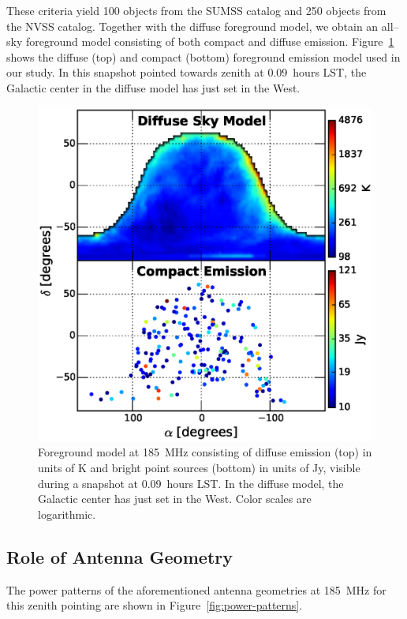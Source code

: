 \documentclass[preprint2,iop,numberedappendix,twocolappendix,appendixfloats]{emulateapj}
\begin{document}
These criteria yield 100 objects from the SUMSS catalog and 250 objects from the NVSS catalog. Together with the diffuse foreground model, we obtain an all--sky foreground model consisting of both compact and diffuse emission. Figure~\ref{fig:sky-model-generic} shows the diffuse (top) and compact (bottom) foreground emission model used in our study. In this snapshot pointed towards zenith at 0.09~hours LST, the Galactic center in the diffuse model has just set in the West. 

\begin{figure}[htb]
\centering
\includegraphics[width=\linewidth]{figure3.eps}
\caption{Foreground model at 185~MHz consisting of diffuse emission (top) in units of K and bright point sources (bottom) in units of Jy, visible during a snapshot at 0.09~hours LST. In the diffuse model, the Galactic center has just set in the West. Color scales are logarithmic. \label{fig:sky-model-generic}}
\end{figure}

\subsection{Role of Antenna Geometry}\label{sec:antenna-shape}

The power patterns of the aforementioned antenna geometries at 185~MHz for this zenith pointing are shown in Figure~\ref{fig:power-patterns}. 
\end{document}

